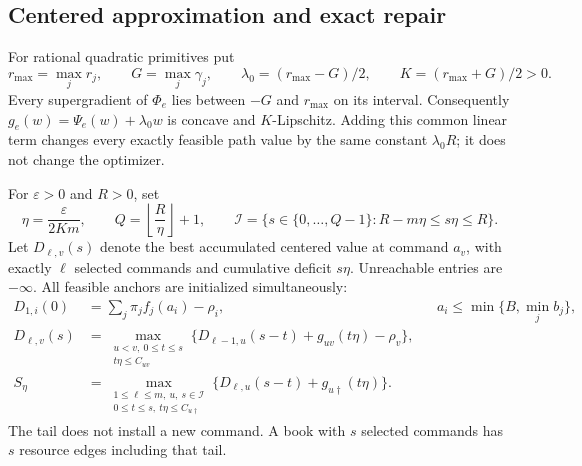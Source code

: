 \documentclass[11pt,letterpaper]{article}
\theoremstyle{definition}\newtheorem{remark}[theorem]{Remark}
\begin{document}
\subsection{Centered approximation and exact repair}
For rational quadratic primitives put
\[
 r_{\max}=\max_jr_j,\qquad G=\max_j\gamma_j,
 \qquad \lambda_0=(r_{\max}-G)/2,\qquad K=(r_{\max}+G)/2>0.
\]
Every supergradient of $\Phi_e$ lies between $-G$ and $r_{\max}$ on its interval. Consequently
$g_e(w)=\Psi_e(w)+\lambda_0w$ is concave and $K$-Lipschitz. Adding this common linear term changes every exactly feasible path value by the same constant $\lambda_0R$; it does not change the optimizer.

For $\varepsilon>0$ and $R>0$, set
\begin{equation}\label{eq:mesh56}
 \eta=\frac{\varepsilon}{2Km},\qquad
 Q=\left\lfloor\frac{R}{\eta}\right\rfloor+1,\qquad
 \mathcal I=\{s\in\{0,\ldots,Q-1\}:R-m\eta\leq s\eta\leq R\}.
\end{equation}
Let $D_{\ell,v}(s)$ denote the best accumulated centered value at command $a_v$, with exactly $\ell$ selected commands and cumulative deficit $s\eta$. Unreachable entries are $-\infty$. All feasible anchors are initialized simultaneously:
\begin{align}
 D_{1,i}(0)&=\sum_j\pi_jf_j(a_i)-\rho_i,
       &&a_i\leq\min\{B,\min_jb_j\},\label{eq:init56}\\
 D_{\ell,v}(s)&=\max_{\substack{u<v,\ 0\leq t\leq s\\t\eta\leq C_{uv}}}
 \{D_{\ell-1,u}(s-t)+g_{uv}(t\eta)-\rho_v\},\label{eq:DP56}\\
 S_\eta&=\max_{\substack{1\leq\ell\leq m,\ u,\ s\in\mathcal I\\0\leq t\leq s,\ t\eta\leq C_{u\dagger}}}
 \{D_{\ell,u}(s-t)+g_{u\dagger}(t\eta)\}.\label{eq:terminal56}
\end{align}
The tail does not install a new command. A book with $s$ selected commands has $s$ resource edges including that tail.
\end{document}
